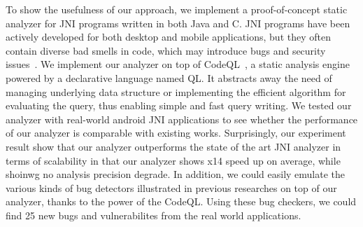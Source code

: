 
To show the usefulness of our approach, we implement a proof-of-concept static
analyzer for JNI programs written in both Java and C. JNI programs have been
actively developed for both desktop and mobile applications, but they often
contain diverse bad smells in code, which may introduce bugs and security
issues~\cite{nishiwaki2012sean, grichi2019state, abidi2019behind,
abidi2021multi}. We implement our analyzer on top of CodeQL~\cite{codeql}, a
static analysis engine powered by a declarative language named QL.  It
abstracts away the need of managing underlying data structure or implementing
the efficient algorithm for evaluating the query, thus enabling simple and fast
query writing. We tested our analyzer with real-world android JNI applications
to see whether the performance of our analyzer is comparable with existing works.
Surprisingly, our experiment result show that our analyzer outperforms the
state of the art JNI analyzer in terms of scalability in that our analyzer
shows x14 speed up on average, while shoinwg no analysis precision degrade. In
addition,  we could easily emulate the various kinds of bug detectors
illustrated in previous researches on top of our analyzer, thanks to the
power of the CodeQL. Using these bug checkers, we could find 25 new bugs and
vulnerabilites from the real world applications.


